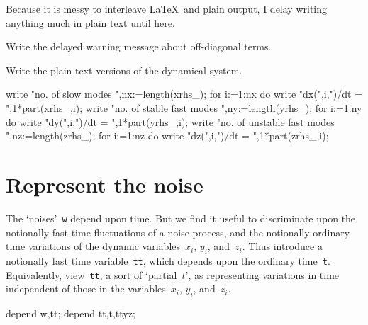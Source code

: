 \documentclass[11pt,a5paper]{article}
\begin{document}
Because it is messy to interleave \LaTeX\ and plain output,
I delay writing anything much in plain text until here.

Write the delayed warning message about off-diagonal terms.

Write the plain text versions of the dynamical system.
\begin{reduce}
write "no. of slow modes ",nx:=length(xrhs_);
for i:=1:nx do write "dx(",i,")/dt = ",1*part(xrhs_,i);
write "no. of stable fast modes ",ny:=length(yrhs_);
for i:=1:ny do write "dy(",i,")/dt = ",1*part(yrhs_,i);
write "no. of unstable fast modes ",nz:=length(zrhs_);
for i:=1:nz do write "dz(",i,")/dt = ",1*part(zrhs_,i);
\end{reduce}



\section{Represent the noise}

The `noises'~\verb|w| depend upon time. But we find it
useful to discriminate upon the notionally fast time
fluctuations of a noise process, and the notionally ordinary
time variations of the dynamic variables~$x_i$, $y_i$,
and~$z_i$. Thus introduce a notionally fast time
variable~\verb|tt|, which depends upon the ordinary
time~\verb|t|. Equivalently, view~\verb|tt|, a sort of
`partial~$t$', as representing variations in time
independent of those in the variables~$x_i$, $y_i$,
and~$z_i$.
\begin{reduce}
depend w,tt;
depend tt,t,ttyz;
\end{reduce}
\end{document}
